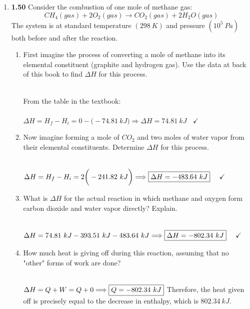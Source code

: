 \documentclass[fleqn]{article}
\begin{document}
  \begin{enumerate}
    \item \textbf{1.50} Consider the combustion of one mole of methane gas:
    $$
      CH_4(gas)+2O_2(gas) \longrightarrow CO_2(gas)+2H_2O(gas)
    $$
    The system is at standard temperature $(298 ~ K)$ and pressure $(10^5 ~ Pa)$ both before and after 
    the reaction.
    \begin{enumerate}
      \item First imagine the process of converting a mole of methane into its elemental constituent (graphite and hydrogen gas).
      Use the data at back of this book to find $\Delta H$ for this process.

          \textcolor{hwColor}{
            \\
            From the table in the textbook:
            \\
            \\
            $
              \Delta H=H_f-H_i=0-\bigg( -74.81 ~ kJ\bigg) \Longrightarrow \boxed{\Delta H=74.81 ~ kJ} ~~~~ \checkmark
            $
            \\
          }

      \item Now imagine forming a mole of $CO_2$ and two moles of water vapor from their elemental constituents. Determine 
      $\Delta H$ for this process.

          \textcolor{hwColor}{
            \\
            $
              \Delta H=H_f-H_i=2\bigg(-241.82 ~ kJ\bigg) \Longrightarrow \boxed{\Delta H=-483.64 ~ kJ} ~~~~ \checkmark
              \\
            $
          }

      \item What is $\Delta H$ for the actual reaction in which methane and oxygen form carbon dioxide and water vapor 
      directly? Explain.

          \textcolor{hwColor}{
            \\
            $
              \Delta H=74.81 ~ kJ-393.51 ~ kJ-483.64 ~ kJ \Longrightarrow \boxed{\Delta H=-802.34 ~ kJ} ~~~~ \checkmark
              \\
            $
          }

      \item How much heat is giving off during this reaction, assuming that no "other" forms of work are done?

          \textcolor{hwColor}{
            \\
            $
              \Delta H=Q+W=Q+0 \Longrightarrow \boxed{Q=-802.34 ~ kJ}
              \\
              \\
            $
            Therefore, the heat given off is precisely equal to the decrease in enthalpy, which is $802.34 ~ kJ$.
            \\
          }


\end{enumerate}
\end{enumerate}
\end{document}
